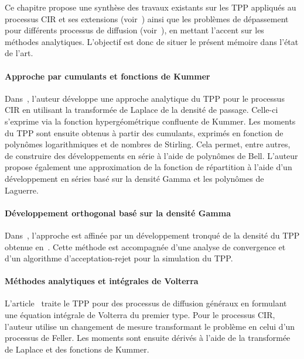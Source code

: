\label{sec:RevLitt}

Ce chapitre propose une synthèse des travaux existants sur les \acs{TPP} appliqués au processus \acs{CIR} et ses extensions (voir~\cite{dinardo2021,dinardo2024,kepplinger2017,giorno2021,giorno2023,martin2011,masoliver2012}) ainsi que les problèmes de dépassement pour différents processus de diffusion (voir~\cite{kou2003,yin2014,kluppelberg2004}), en mettant l'accent sur les méthodes analytiques. L'objectif est donc de situer le présent mémoire dans l'état de l'art.

\paragraph{Approche par cumulants et fonctions de Kummer}

Dans~\cite{dinardo2021}, l'auteur développe une approche analytique du \acs{TPP} pour le processus \acs{CIR} en utilisant la transformée de Laplace de la densité de passage. Celle-ci s'exprime via la fonction hypergéométrique confluente de Kummer. Les moments du \acs{TPP} sont ensuite obtenus à partir des cumulants, exprimés en fonction de polynômes logarithmiques et de nombres de Stirling. Cela permet, entre autres, de construire des développements en série à l'aide de polynômes de Bell. L'auteur propose également une approximation de la fonction de répartition à l'aide d'un développement en séries basé sur la densité Gamma et les polynômes de Laguerre.

\paragraph{Développement orthogonal basé sur la densité Gamma}

Dans~\cite{dinardo2024}, l'approche est affinée par un développement tronqué de la densité du \acs{TPP} obtenue en~\cite{dinardo2021}. Cette méthode est accompagnée d'une analyse de convergence et d'un algorithme d'acceptation-rejet pour la simulation du \acs{TPP}.

\paragraph{Méthodes analytiques et intégrales de Volterra}

L'article~\cite{kepplinger2017} traite le \acs{TPP} pour des processus de diffusion généraux en formulant une équation intégrale de Volterra du premier type. Pour le processus \acs{CIR}, l'auteur utilise un changement de mesure transformant le problème en celui d'un processus de Feller. Les moments sont ensuite dérivés à l'aide de la transformée de Laplace et des fonctions de Kummer.

